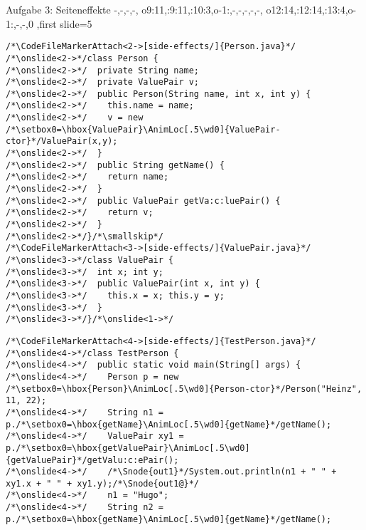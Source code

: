 {\begin{frame}[fragile,t]{Aufgabe 3: Seiteneffekte}
{{    -,-,-,-, %
    o9:{11},:9:{11},:10:{3},o-1:{},-,-,-,-,-, %
    o12:{14},:12:{14},:13:{4},o-1:{},-,-,0
},first slide=5}
\begin{verbatim}
/*\CodeFileMarkerAttach<2->[side-effects/]{Person.java}*/
/*\onslide<2->*/class Person {
/*\onslide<2->*/  private String name;
/*\onslide<2->*/  private ValuePair v;
/*\onslide<2->*/  public Person(String name, int x, int y) {
/*\onslide<2->*/    this.name = name;
/*\onslide<2->*/    v = new /*\setbox0=\hbox{ValuePair}\AnimLoc[.5\wd0]{ValuePair-ctor}*/ValuePair(x,y);
/*\onslide<2->*/  }
/*\onslide<2->*/  public String getName() {
/*\onslide<2->*/    return name;
/*\onslide<2->*/  }
/*\onslide<2->*/  public ValuePair getVa:c:luePair() {
/*\onslide<2->*/    return v;
/*\onslide<2->*/  }
/*\onslide<2->*/}/*\smallskip*/
/*\CodeFileMarkerAttach<3->[side-effects/]{ValuePair.java}*/
/*\onslide<3->*/class ValuePair {
/*\onslide<3->*/  int x; int y;
/*\onslide<3->*/  public ValuePair(int x, int y) {
/*\onslide<3->*/    this.x = x; this.y = y;
/*\onslide<3->*/  }
/*\onslide<3->*/}/*\onslide<1->*/
\end{verbatim}
\endAnimateCode
{}
\begin{verbatim}
/*\CodeFileMarkerAttach<4->[side-effects/]{TestPerson.java}*/
/*\onslide<4->*/class TestPerson {
/*\onslide<4->*/  public static void main(String[] args) {
/*\onslide<4->*/    Person p = new /*\setbox0=\hbox{Person}\AnimLoc[.5\wd0]{Person-ctor}*/Person("Heinz", 11, 22);
/*\onslide<4->*/    String n1 = p./*\setbox0=\hbox{getName}\AnimLoc[.5\wd0]{getName}*/getName();
/*\onslide<4->*/    ValuePair xy1 = p./*\setbox0=\hbox{getValuePair}\AnimLoc[.5\wd0]{getValuePair}*/getValu:c:ePair();
/*\onslide<4->*/    /*\Snode{out1}*/System.out.println(n1 + " " + xy1.x + " " + xy1.y);/*\Snode{out1@}*/
/*\onslide<4->*/    n1 = "Hugo";
/*\onslide<4->*/    String n2 = p./*\setbox0=\hbox{getName}\AnimLoc[.5\wd0]{getName}*/getName();

\end{verbatim}
\end{frame}}
